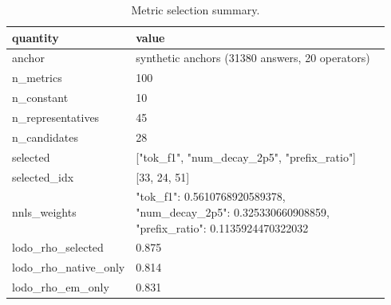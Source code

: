\begin{table}[htbp]
\centering\scriptsize
\caption{Metric selection summary.}
\label{tab:selected}
\setlength{\tabcolsep}{3pt}
\begin{tabular}{p{0.154\linewidth}p{0.788\linewidth}}
\toprule
quantity & value \\
\midrule
anchor & synthetic anchors (31380 answers, 20 operators) \\
n\_\allowbreak{}metrics & 100 \\
n\_\allowbreak{}constant & 10 \\
n\_\allowbreak{}representatives & 45 \\
n\_\allowbreak{}candidates & 28 \\
selected & ["tok\_\allowbreak{}f1", "num\_\allowbreak{}decay\_\allowbreak{}2p5", "prefix\_\allowbreak{}ratio"] \\
selected\_\allowbreak{}idx & [33, 24, 51] \\
nnls\_\allowbreak{}weights & {"tok\_\allowbreak{}f1": 0.5610768920589378, "num\_\allowbreak{}decay\_\allowbreak{}2p5": 0.325330660908859, "prefix\_\allowbreak{}ratio": 0.1135924470322032} \\
lodo\_\allowbreak{}rho\_\allowbreak{}selected & 0.875 \\
lodo\_\allowbreak{}rho\_\allowbreak{}native\_\allowbreak{}only & 0.814 \\
lodo\_\allowbreak{}rho\_\allowbreak{}em\_\allowbreak{}only & 0.831 \\
\bottomrule
\end{tabular}
\end{table}
